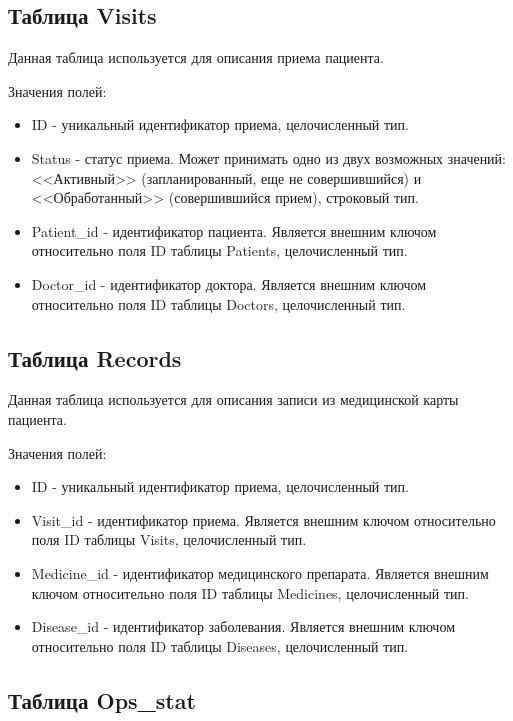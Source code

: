 \subsection*{Таблица Visits}

Данная таблица используется для описания приема пациента.

Значения полей:

\begin{itemize}
	\item ID - уникальный идентификатор приема, целочисленный тип.
	\item Status - статус приема. Может принимать одно из двух возможных значений: <<Активный>> (запланированный, еще не совершившийся) и <<Обработанный>> (совершившийся прием), строковый тип.
	\item Patient\_id - идентификатор пациента. Является внешним ключом относительно поля ID таблицы Patients, целочисленный тип.
	\item Doctor\_id - идентификатор доктора. Является внешним ключом относительно поля ID таблицы Doctors, целочисленный тип.
\end{itemize}

\subsection*{Таблица Records}

Данная таблица используется для описания записи из медицинской карты пациента.

Значения полей:

\begin{itemize}
	\item ID - уникальный идентификатор приема, целочисленный тип.
	\item Visit\_id - идентификатор приема. Является внешним ключом относительно поля ID таблицы Visits, целочисленный тип.
	\item Medicine\_id - идентификатор медицинского препарата. Является внешним ключом относительно поля ID таблицы Medicines, целочисленный тип.
	\item Disease\_id - идентификатор заболевания. Является внешним ключом относительно поля ID таблицы Diseases, целочисленный тип.
\end{itemize}

\subsection*{Таблица Ops\_stat}

